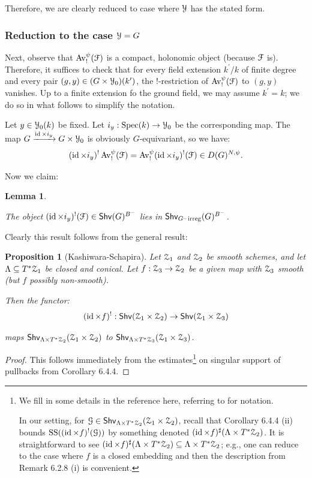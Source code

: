 \documentclass[reqno,11pt]{amsart}
\numberwithin{equation}{subsection}
\newtheorem{lem}[thm]{Lemma}
\newtheorem{prop}[thm]{Proposition}
\theoremstyle{remark}
\newcommand{\xar}[1]{\xrightarrow{#1}}
\newcommand{\sF}{{\EuScript F}}
\newcommand{\sG}{{\EuScript G}}
\newcommand{\sY}{{\EuScript Y}}
\newcommand{\sZ}{{\EuScript Z}}
\newcommand{\on}{\operatorname}
\newcommand{\mathendash}{\text{\textendash}}
\newcommand{\Spec}{\on{Spec}}
\newcommand{\id}{\on{id}}
\newcommand{\Av}{\on{Av}}
\renewcommand{\subset}{\subseteq}
\newcommand{\Shv}{\mathsf{Shv}}
\newcommand{\irreg}{\on{irreg}}
\newcommand{\Girreg}{G\mathendash\irreg}
\renewcommand{\SS}{\on{SS}}
\begin{document}
Therefore, we are clearly reduced to case where $\sY$ has the stated form.

\subsubsection{Reduction to the case $\sY = G$}

Next, observe that $\Av_!^{\psi}(\sF)$ is a compact, holonomic 
object (because $\sF$ is).
Therefore, it suffices to check that for every field extension
$k^{\prime}/k$ of finite degree and every pair 
$(g,y) \in (G \times \sY_0)(k^{\prime})$, the
$!$-restriction of $\Av_!^{\psi}(\sF)$ to $(g,y)$ vanishes.
Up to a finite extension fo the ground field, we may assume $k^{\prime} = k$;
we do so in what follows to simplify the notation. 

Let $y \in \sY_0(k)$ be fixed. Let $i_y:\Spec(k) \to \sY_0$ be
the corresponding map. The map $G \xar{\id \times i_y} G \times \sY_0$
is obviously $G$-equivariant, so we have:
%
\[
(\id\times i_y)^!\Av_!^{\psi}(\sF) = 
\Av_!^{\psi}(\id\times i_y)^!(\sF) \in D(G)^{N,\psi}. 
\] 

Now we claim:
%
\begin{lem}\label{l:irreg-functoriality}

The object $(\id\times i_y)^!(\sF) \in \Shv(G)^{B^-}$ lies
in $\Shv_{\Girreg}(G)^{B^-}$. 

\end{lem}

Clearly this result follows from the general result:

\begin{prop}[Kashiwara-Schapira]

Let $\sZ_1$ and $\sZ_2$ be smooth schemes, and let
$\Lambda \subset T^*\sZ_1$ be closed and conical. Let $f:\sZ_3 \to \sZ_2$
be a given map with $\sZ_3$ smooth (but $f$ possibly non-smooth).

Then the functor: 
%
\[
(\id \times f)^!:\Shv(\sZ_1 \times \sZ_2) \to 
\Shv(\sZ_1 \times \sZ_3)
\]

\noindent maps $\Shv_{\Lambda \times T^*\sZ_2}(\sZ_1 \times \sZ_2)$ to 
$\Shv_{\Lambda \times T^*\sZ_3}(\sZ_1 \times \sZ_3)$.

\end{prop}

\begin{proof}

This follows immediately from the estimates\footnote{We fill in some
details in the reference here, referring to \cite{ks} for notation.

In our setting, for $\sG \in \Shv_{\Lambda \times T^*\sZ_2}(\sZ_1 \times \sZ_2)$,
recall that \cite{ks} Corollary 6.4.4 (ii) bounds $\SS((\id \times f)^!(\sG))$
by something denoted $(\id \times f)^{\sharp}( \Lambda \times T^*\sZ_2)$.
It is straightforward to see $(\id \times f)^{\sharp}( \Lambda \times T^*\sZ_2)
\subset \Lambda \times T^*\sZ_2$; e.g., one can reduce to the
case where $f$ is a closed embedding and then the description 
from \cite{ks} Remark 6.2.8 (i) is convenient.}
on singular support of pullbacks from \cite{ks} Corollary 6.4.4.

\end{proof}
\end{document}
